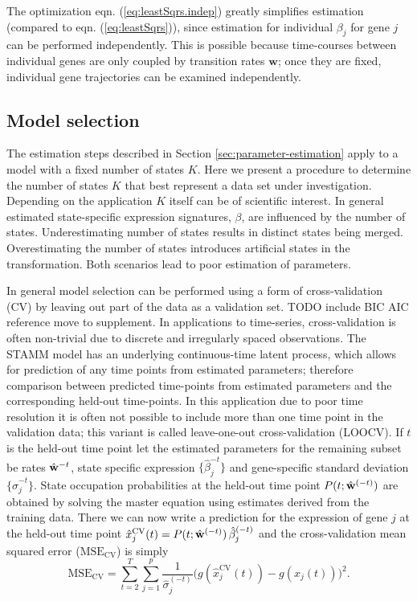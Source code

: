The optimization eqn. (\ref{eq:leastSqrs.indep}) greatly simplifies estimation (compared to  eqn. (\ref{eq:leastSqrs})), since estimation for individual $\beta_j$ for gene $j$ can be performed independently. This is possible because time-courses between individual genes are only coupled by transition rates $\mathbf{w}$; once they are fixed, individual gene trajectories can be examined independently. 

\subsection{Model selection}
\label{sec:model-selection}

The estimation steps described in Section \ref{sec:parameter-estimation} apply to a model with a fixed number of states $K$. Here we present a procedure to determine the number of states $K$ that best represent a data set under investigation. Depending on the application $K$ itself can be of scientific interest. In general estimated state-specific expression signatures, $\beta$, are influenced by the number of states. Underestimating number of states results in distinct states being merged. Overestimating the number of states introduces artificial states in the transformation. Both scenarios lead to poor estimation of parameters. 

In general model selection can be performed using a form of cross-validation (CV) by leaving out part of the data as a validation set.  {\color{red} TODO include BIC AIC reference move to supplement}. In applications to time-series, cross-validation is often non-trivial due to discrete and irregularly spaced observations. The STAMM model has an underlying continuous-time latent process, which allows for prediction of any time points from estimated parameters; therefore comparison between predicted time-points from estimated parameters and the corresponding held-out time-points. In this application due to poor time resolution it is often not possible to include more than one time point in the validation data; this variant is called leave-one-out cross-validation (LOOCV). If $t$ is the held-out time point let the estimated parameters for the remaining subset be rates $\hat{\bf{w}}^{-t}$, state specific expression $\lbrace \hat{\beta}_j^{-t} \rbrace$ and gene-specific standard deviation $\lbrace \hat{\sigma}_j^{-t} \rbrace$. State occupation probabilities at the held-out time point  $P(t; \hat{\bf{w}}^{(-t)})$ are obtained by solving the master equation using estimates derived from the training data. There we can now write a prediction for the expression of gene $j$ at the held-out time point $\hat{x}^{\mathrm{CV}}_j(t) = P(t; \hat{\bf{w}}^{(-t)})\, \hat{\beta}_j^{(-t)}$ and the cross-validation 
mean squared error ($\mathrm{MSE_{CV}}$) is simply
\begin{equation}
  \mathrm{MSE_{CV}}  =  \sum_{t=2}^T \sum_{j=1}^p \frac{1}{\hat{\sigma}_j^{(-t)}}\bigl( g(\hat{x}^{\mathrm{CV}}_j(t)) - g(x_j(t)) \bigr)^2.
  \label{eq:mse-cv}
\end{equation}


